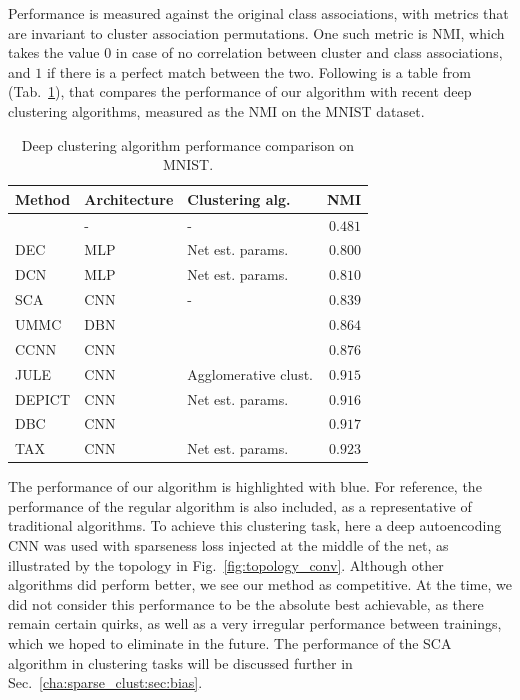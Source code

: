 			Performance is measured against the original class associations, with metrics that are invariant to cluster association permutations.
			One such metric is \ac{NMI}, which takes the value $0$ in case of no correlation between cluster and class associations, and $1$ if there is a perfect match between the two.
			Following is a table from \cite{aljalbout2018clustering} (Tab.~\ref{tab:deepcluster}), that compares the performance of our algorithm with recent deep clustering algorithms, measured as the \ac{NMI} on the MNIST dataset.			
					
			\begin{table}[t]
				\centering
				\renewcommand*{\arraystretch}{1.2}
				\begin{tabular}{l l l|r}					
					Method										&Architecture	&Clustering alg.		&NMI		\\
					\hline
					\kmeans{}									&-				&-						&$0.481$	\\
					DEC	\cite{dec}								&\ac{MLP}		&Net est. params.		&$0.800$	\\
					DCN	\cite{dcn}								&\ac{MLP}		&Net est. params.		&$0.810$	\\
					\rowcolor{hlbluedark}SCA					&\ac{CNN}		&-						&$0.839$	\\
					UMMC \cite{umcc}							&\ac{DBN}		&\kmeans{}				&$0.864$	\\
					CCNN \cite{ccnn}							&\ac{CNN}		&\kmeans{}				&$0.876$	\\
					JULE \cite{jule}							&\ac{CNN}		&Agglomerative clust.	&$0.915$	\\
					DEPICT \cite{depict}						&\ac{CNN}		&Net est. params.		&$0.916$	\\
					DBC	\cite{dbc}								&\ac{CNN}		&\kmeans{}				&$0.917$	\\
					TAX	\cite{aljalbout2018clustering}			&\ac{CNN}		&Net est. params.		&$0.923$
				\end{tabular}
				\caption[Deep clustering algorithm performance comparison on MNIST]{Deep clustering algorithm performance comparison on MNIST.}
				\label{tab:deepcluster}
			\end{table}
			
			
			The performance of our algorithm is highlighted with blue.
			For reference, the performance of the regular \kmeans{} algorithm is also included, as a representative of traditional algorithms.
			To achieve this clustering task, here a deep autoencoding \ac{CNN} was used with sparseness loss injected at the middle of the net, as illustrated by the topology in Fig.~\ref{fig:topology_conv}.
			Although other algorithms did perform better, we see our method as competitive.
			At the time, we did not consider this performance to be the absolute best achievable, as there remain certain quirks, as well as a very irregular performance between trainings, which we hoped to eliminate in the future.
			The performance of the \ac{SCA} algorithm in clustering tasks will be discussed further in Sec.~\ref{cha:sparse_clust:sec:bias}.
			

